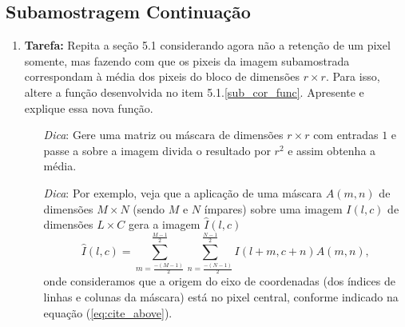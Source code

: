 \documentclass[11pt]{article}
\begin{document}
\subsection{Subamostragem Continuação}

\begin{enumerate}

\item \textbf{Tarefa:} Repita a seção 5.1 considerando agora não a retenção de um pixel somente, mas fazendo com que os pixeis da imagem subamostrada correspondam à média dos pixeis do bloco de dimensões $r\times r$. Para isso, altere a função desenvolvida no item 5.1.\ref{sub_cor_func}. Apresente e explique essa nova função.

\begin{itemize}
\item[\textit{Dica}:] Gere uma matriz ou máscara de dimensões $r \times r$ com entradas $1$ e passe a sobre a imagem divida o resultado por $r^2$ e assim obtenha a média.

\item[\textit{Dica}:] Por exemplo, veja que a aplicação de uma máscara $A(m,n)$ de dimensões $M\times N$ (sendo $M$ e $N$ ímpares) sobre uma imagem $I(l,c)$ de dimensões $L \times C$ gera a imagem $\hat{I}(l,c)$ 
\begin{equation}
\hat{I}(l,c) = \sum_{m = \frac{-(M-1)}{2}}^{\frac{M-1}{2} } \sum_{n = \frac{-(N-1)}{2}}^{\frac{N-1}{2}} I(l+m,c+n)A(m,n),
\end{equation}
onde consideramos que a origem do eixo de coordenadas (dos índices de linhas e colunas da máscara) está no pixel central, conforme indicado na equação (\ref{eq:cite_above}).


\end{itemize}
\end{enumerate}
\end{document}
